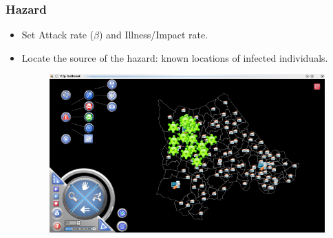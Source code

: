 \documentclass[hyperref={pdfpagelabels=true}]{beamer}
\begin{document}
\begin{frame}
\frametitle{Hazard}
\begin{itemize}
\item Set Attack rate ($\beta$) and Illness/Impact rate. %
\item Locate the source of the hazard: known locations of infected individuals.
\begin{figure}
\includegraphics[scale=0.4]{hazard.png}
\end{figure}
\end{itemize}
\end{frame}
\end{document}
